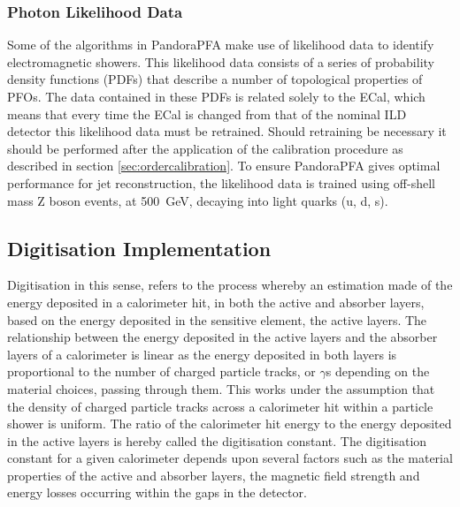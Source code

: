 \subsubsection{Photon Likelihood Data}
Some of the algorithms in PandoraPFA make use of likelihood data to identify electromagnetic showers.  This likelihood data consists of a series of probability density functions (PDFs) that describe a number of topological properties of PFOs.  The data contained in these PDFs is related solely to the ECal, which means that every time the ECal is changed from that of the nominal ILD detector this likelihood data must be retrained.  Should retraining be necessary it should be performed after the application of the calibration procedure as described in section \ref{sec:ordercalibration}.  To ensure PandoraPFA gives optimal performance for jet reconstruction, the likelihood data is trained using off-shell mass Z boson events, at 500~GeV, decaying into light quarks (u, d, s).  


\subsection{Digitisation Implementation}
\label{sec:digi}
Digitisation in this sense, refers to the process whereby an estimation made of the energy deposited in a calorimeter hit, in both the active and absorber layers, based on the energy deposited in the sensitive element, the active layers.  The relationship between the energy deposited in the active layers and the absorber layers of a calorimeter is linear as the energy deposited in both layers is proportional to the number of charged particle tracks, or $\gamma$s depending on the material choices, passing through them.  This works under the assumption that the density of charged particle tracks across a calorimeter hit within a particle shower is uniform.  The ratio of the calorimeter hit energy to the energy deposited in the active layers is hereby called the digitisation constant.  The digitisation constant for a given calorimeter depends upon several factors such as the material properties of the active and absorber layers, the magnetic field strength and energy losses occurring within the gaps in the detector.  


